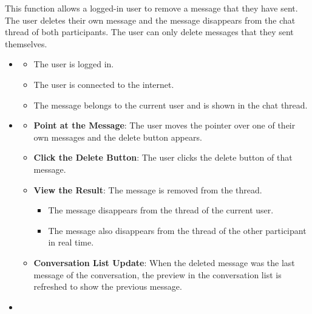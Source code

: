  This function allows a logged-in user to remove a message that they have sent. The user deletes their own message and the message disappears from the chat thread of both participants. The user can only delete messages that they sent themselves.



\begin{itemize}[leftmargin=1.6em,topsep=4pt,itemsep=3pt,parsep=0pt,label=$\bullet$]
    \item {}

        \begin{itemize}[leftmargin=2.2em,topsep=2pt,itemsep=3pt,parsep=0pt,label=$\circ$]
            \item The user is logged in.
            \item The user is connected to the internet.
            \item The message belongs to the current user and is shown in the chat thread.
        \end{itemize}
    \item {}

        \begin{itemize}[leftmargin=2.2em,topsep=2pt,itemsep=3pt,parsep=0pt,label=$\circ$]
            \item \textbf{Point at the Message}: The user moves the pointer over one of their own messages and the delete button appears.
            \item \textbf{Click the Delete Button}: The user clicks the delete button of that message.
            \item \textbf{View the Result}: The message is removed from the thread.
                \begin{itemize}[leftmargin=2.2em,topsep=2pt,itemsep=3pt,parsep=0pt,label=$\blacksquare$]
                    \item The message disappears from the thread of the current user.
                    \item The message also disappears from the thread of the other participant in real time.
                \end{itemize}
            \item \textbf{Conversation List Update}: When the deleted message was the last message of the conversation, the preview in the conversation list is refreshed to show the previous message.
        \end{itemize}
    \item {}


\end{itemize}
